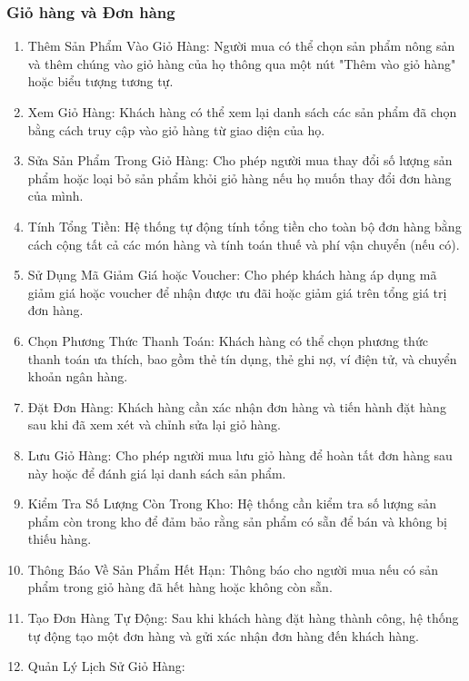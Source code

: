         \subsubsection{Giỏ hàng và Đơn hàng}
        \begin{enumerate}
            \item Thêm Sản Phẩm Vào Giỏ Hàng:
        Người mua có thể chọn sản phẩm nông sản và thêm chúng vào giỏ hàng của họ thông qua một nút "Thêm vào giỏ hàng" hoặc biểu tượng tương tự.
        \item Xem Giỏ Hàng:
        Khách hàng có thể xem lại danh sách các sản phẩm đã chọn bằng cách truy cập vào giỏ hàng từ giao diện của họ.
            \item Sửa Sản Phẩm Trong Giỏ Hàng:
        Cho phép người mua thay đổi số lượng sản phẩm hoặc loại bỏ sản phẩm khỏi giỏ hàng nếu họ muốn thay đổi đơn hàng của mình.
            \item Tính Tổng Tiền:
        Hệ thống tự động tính tổng tiền cho toàn bộ đơn hàng bằng cách cộng tất cả các món hàng và tính toán thuế và phí vận chuyển (nếu có).
            \item Sử Dụng Mã Giảm Giá hoặc Voucher:
        Cho phép khách hàng áp dụng mã giảm giá hoặc voucher để nhận được ưu đãi hoặc giảm giá trên tổng giá trị đơn hàng.
            \item Chọn Phương Thức Thanh Toán:
        Khách hàng có thể chọn phương thức thanh toán ưa thích, bao gồm thẻ tín dụng, thẻ ghi nợ, ví điện tử, và chuyển khoản ngân hàng.
            \item Đặt Đơn Hàng:
        Khách hàng cần xác nhận đơn hàng và tiến hành đặt hàng sau khi đã xem xét và chỉnh sửa lại giỏ hàng.
            \item Lưu Giỏ Hàng:
        Cho phép người mua lưu giỏ hàng để hoàn tất đơn hàng sau này hoặc để đánh giá lại danh sách sản phẩm.
            \item Kiểm Tra Số Lượng Còn Trong Kho:
        Hệ thống cần kiểm tra số lượng sản phẩm còn trong kho để đảm bảo rằng sản phẩm có sẵn để bán và không bị thiếu hàng.
            \item Thông Báo Về Sản Phẩm Hết Hạn:
        Thông báo cho người mua nếu có sản phẩm trong giỏ hàng đã hết hàng hoặc không còn sẵn.
            \item Tạo Đơn Hàng Tự Động:
        Sau khi khách hàng đặt hàng thành công, hệ thống tự động tạo một đơn hàng và gửi xác nhận đơn hàng đến khách hàng.
            \item Quản Lý Lịch Sử Giỏ Hàng:

\end{enumerate}
